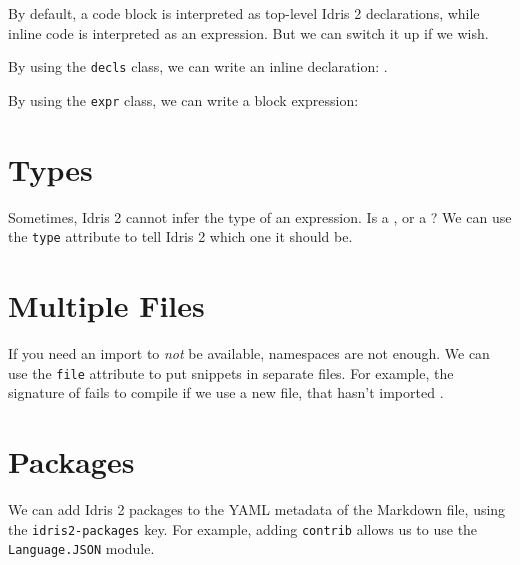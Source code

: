 By default, a code block is interpreted as top-level Idris 2
declarations, while inline code is interpreted as an expression. But we
can switch it up if we wish.

By using the \texttt{decls} class, we can write an inline declaration:
\KatlaSnippet{}.

By using the \texttt{expr} class, we can write a block expression:

\KatlaSnippet{}

\hypertarget{types}{%
\section{Types}\label{types}}

Sometimes, Idris 2 cannot infer the type of an expression. Is
\KatlaSnippet{} a \KatlaSnippet{}, or a
\KatlaSnippet{}? We can use the \texttt{type} attribute to tell
Idris 2 which one it should be.

\hypertarget{multiple-files}{%
\section{Multiple Files}\label{multiple-files}}

If you need an import to \emph{not} be available, namespaces are not
enough. We can use the \texttt{file} attribute to put snippets in
separate files. For example, the signature of \KatlaSnippet{}
fails to compile if we use a new file, that hasn't imported
\KatlaSnippet{}.

\KatlaSnippet{}

\hypertarget{packages}{%
\section{Packages}\label{packages}}

We can add Idris 2 packages to the YAML metadata of the Markdown file,
using the \texttt{idris2-packages} key. For example, adding
\texttt{contrib} allows us to use the \texttt{Language.JSON} module.

\KatlaSnippet{}
